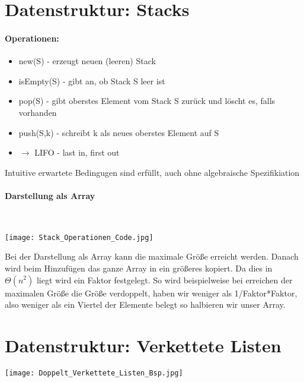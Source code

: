 \vspace{1.5cm}
\section{Datenstruktur: Stacks}

	\paragraph{Operationen:}
	\begin{itemize}
		\item new(S)		- erzeugt neuen (leeren) Stack
		\item isEmpty(S)	- gibt an, ob Stack S leer ist
		\item pop(S)		- gibt oberstes Element vom Stack S zurück und löscht es, falls vorhanden
		\item push(S,k)		- schreibt k als neues oberstes Element auf S
		\item $\longrightarrow$ LIFO - last in, first out
	\end{itemize}
	\begin{center}
		Intuitive erwartete Bedingugen sind erfüllt, auch ohne algebraische Spezifikiation
	\end{center}

	\paragraph{Darstellung als Array} \mbox{} \\
	\begin{center}
		\texttt{[image: Stack\_Operationen\_Code.jpg]}
	\end{center}

	Bei der Darstellung als Array kann die maximale Grö\ss e erreicht werden. Danach wird beim 
	Hinzufügen das ganze Array in ein größeres kopiert. Da dies in $\Theta (n^2)$ liegt wird ein
	Faktor festgelegt. So wird beispielweise bei erreichen der maximalen Grö\ss e die Grö\ss e
	verdoppelt, haben wir weniger als 1/Faktor*Faktor, also weniger als ein Viertel der Elemente belegt
	so halbieren wir unser Array.




\vspace{1.5cm}
\section{Datenstruktur: Verkettete Listen}

	\begin{center}
		\texttt{[image: Doppelt\_Verkettete\_Listen\_Bsp.jpg]}
	\end{center}

